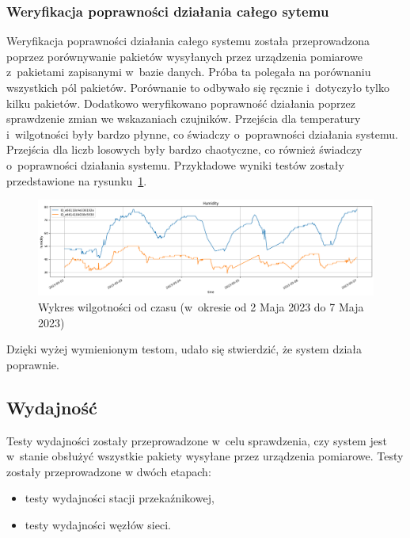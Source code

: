 \subsubsection{Weryfikacja poprawności działania całego sytemu}
Weryfikacja poprawności działania całego systemu została przeprowadzona poprzez porównywanie pakietów wysyłanych przez urządzenia pomiarowe z~pakietami zapisanymi w~bazie danych.
Próba ta polegała na porównaniu wszystkich pól pakietów.
Porównanie to odbywało się ręcznie i~dotyczyło tylko kilku pakietów.
Dodatkowo weryfikowano poprawność działania poprzez sprawdzenie zmian we wskazaniach czujników.
Przejścia dla temperatury i~wilgotności były bardzo płynne, co świadczy o~poprawności działania systemu.
Przejścia dla liczb losowych były bardzo chaotyczne, co również świadczy o~poprawności działania systemu.
Przykładowe wyniki testów zostały przedstawione na rysunku~\ref{rys:porownanie-hum}.
\begin{figure}[b!]
    \begin{center}
        \includegraphics[width=15cm]{pic/diagram-humidity.png}
    \end{center}
    \caption{Wykres wilgotności od czasu (w~okresie od 2 Maja 2023 do 7 Maja 2023)}\label{rys:porownanie-hum}
\end{figure}


Dzięki wyżej wymienionym testom, udało się stwierdzić, że system działa poprawnie.

\subsection{Wydajność}
Testy wydajności zostały przeprowadzone w~celu sprawdzenia, czy system jest w~stanie obsłużyć wszystkie pakiety wysyłane przez urządzenia pomiarowe.
Testy zostały przeprowadzone w dwóch etapach:
\begin{itemize}
    \item testy wydajności stacji przekaźnikowej,
    \item testy wydajności węzłów sieci.
\end{itemize}

